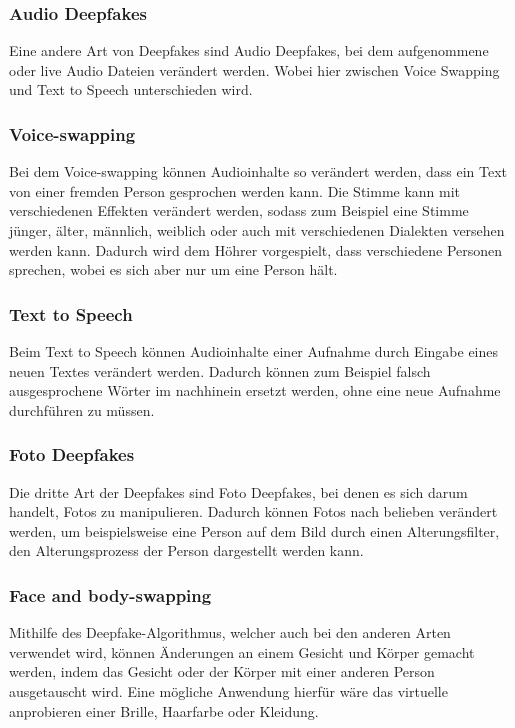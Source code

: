 \subsubsection*{Audio Deepfakes}
Eine andere Art von Deepfakes sind Audio Deepfakes, bei dem aufgenommene oder live Audio Dateien verändert werden. Wobei hier zwischen Voice Swapping und Text to Speech unterschieden wird.\cite{ResearchGate}

\subsubsection*{Voice-swapping}
Bei dem Voice-swapping können Audioinhalte so verändert werden, dass ein Text von einer fremden Person gesprochen werden kann. Die Stimme kann mit verschiedenen Effekten verändert werden, sodass zum Beispiel eine Stimme jünger, älter, männlich, weiblich oder auch mit verschiedenen Dialekten versehen werden kann.
Dadurch wird dem Höhrer vorgespielt, dass verschiedene Personen sprechen, wobei es sich aber nur um eine Person hält.\cite{ResearchGate}

\subsubsection*{Text to Speech}
Beim Text to Speech können Audioinhalte einer Aufnahme durch Eingabe eines neuen Textes verändert werden. Dadurch können zum Beispiel falsch ausgesprochene Wörter im nachhinein ersetzt werden, ohne eine neue Aufnahme durchführen zu müssen.\cite{ResearchGate}

\subsubsection*{Foto Deepfakes}
Die dritte Art der Deepfakes sind Foto Deepfakes, bei denen es sich darum handelt, Fotos zu manipulieren. Dadurch können Fotos nach belieben verändert werden, um beispielsweise eine Person auf dem Bild durch einen Alterungsfilter, den Alterungsprozess der Person dargestellt werden kann.\cite{ResearchGate}

\subsubsection*{Face and body-swapping}
Mithilfe des Deepfake-Algorithmus, welcher auch bei den anderen Arten verwendet wird, können Änderungen an einem Gesicht und Körper gemacht werden, indem das Gesicht oder der Körper mit einer anderen Person ausgetauscht wird. Eine mögliche Anwendung hierfür wäre das virtuelle anprobieren einer Brille, Haarfarbe oder Kleidung.\cite{ResearchGate}

